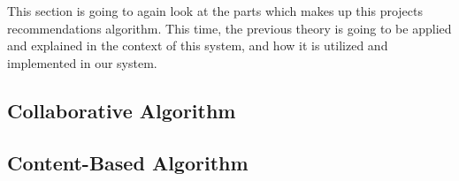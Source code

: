 This section is going to again look at the parts which makes up this projects recommendations algorithm. This time, the previous theory is going to be applied and explained in the context of this system, and how it is utilized and implemented in our system.

\subsection{Collaborative Algorithm}
\label{CollaborativeAlg}

\subsection{Content-Based Algorithm}
\label{ContentBasedAlg}
